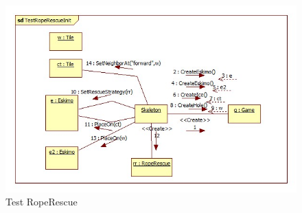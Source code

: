 \begin{figure}[H]
	\begin{center}
		\includegraphics[width=17cm]{chapters/chapter05/diagrams/Test_RopeRescue_init.jpg}
		\caption{Test RopeRescue}
		\label{fig:Test RopeRescue}
	\end{center}
\end{figure}

